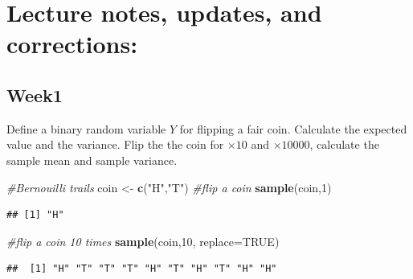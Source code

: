 \documentclass[
]{book}
\newenvironment{Shaded}{\begin{snugshade}}{\end{snugshade}}
\newcommand{\CommentTok}[1]{\textcolor[rgb]{0.56,0.35,0.01}{\textit{#1}}}
\newcommand{\DataTypeTok}[1]{\textcolor[rgb]{0.13,0.29,0.53}{#1}}
\newcommand{\DecValTok}[1]{\textcolor[rgb]{0.00,0.00,0.81}{#1}}
\newcommand{\KeywordTok}[1]{\textcolor[rgb]{0.13,0.29,0.53}{\textbf{#1}}}
\newcommand{\NormalTok}[1]{#1}
\newcommand{\OtherTok}[1]{\textcolor[rgb]{0.56,0.35,0.01}{#1}}
\newcommand{\StringTok}[1]{\textcolor[rgb]{0.31,0.60,0.02}{#1}}
\begin{document}
\hypertarget{lecture-notes-updates-and-corrections}{%
\chapter{Lecture notes, updates, and corrections:}\label{lecture-notes-updates-and-corrections}}

\hypertarget{week1}{%
\section{Week1}\label{week1}}

Define a binary random variable \(Y\) for flipping a fair coin. Calculate the expected value and the variance. Flip the the coin for \(\times 10\) and \(\times 10000\), calculate the sample mean and sample variance.

\begin{Shaded}
\begin{Highlighting}[]
\CommentTok{#Bernouilli trails }
\NormalTok{coin <-}\StringTok{ }\KeywordTok{c}\NormalTok{(}\StringTok{"H"}\NormalTok{,}\StringTok{"T"}\NormalTok{)}
\CommentTok{#flip a coin }
\KeywordTok{sample}\NormalTok{(coin,}\DecValTok{1}\NormalTok{)}
\end{Highlighting}
\end{Shaded}

\begin{verbatim}
## [1] "H"
\end{verbatim}

\begin{Shaded}
\begin{Highlighting}[]
\CommentTok{#flip a coin 10 times}
\KeywordTok{sample}\NormalTok{(coin,}\DecValTok{10}\NormalTok{, }\DataTypeTok{replace=}\OtherTok{TRUE}\NormalTok{)}
\end{Highlighting}
\end{Shaded}

\begin{verbatim}
##  [1] "H" "T" "T" "T" "H" "T" "H" "T" "H" "H"
\end{verbatim}
\end{document}
